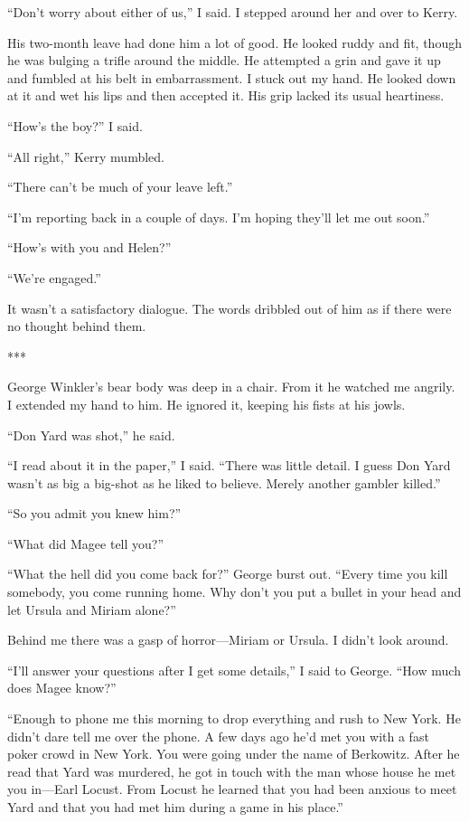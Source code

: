 {“Don’t worry about either of us,” I said. I stepped around her and over to Kerry.

His two-month leave had done him a lot of good. He looked ruddy and fit, though he was bulging a trifle around the middle. He attempted a grin and gave it up and fumbled at his belt in embarrassment. I stuck out my hand. He looked down at it and wet his lips and then accepted it. His grip lacked its usual heartiness.

“How’s the boy?” I said.

“All right,” Kerry mumbled.

“There can’t be much of your leave left.”

“I’m reporting back in a couple of days. I’m hoping they’ll let me out soon.”

“How’s with you and Helen?”

“We’re engaged.”

It wasn’t a satisfactory dialogue. The words dribbled out of him as if there were no thought behind them.

***

George Winkler’s bear body was deep in a chair. From it he watched me angrily. I extended my hand to him. He ignored it, keeping his fists at his jowls.

“Don Yard was shot,” he said.

“I read about it in the paper,” I said. “There was little detail. I guess Don Yard wasn’t as big a big-shot as he liked to believe. Merely another gambler killed.”

“So you admit you knew him?”

“What did Magee tell you?”

“What the hell did you come back for?” George burst out. “Every time you kill somebody, you come running home. Why don’t you put a bullet in your head and let Ursula and Miriam alone?”

Behind me there was a gasp of horror—Miriam or Ursula. I didn’t look around.

“I’ll answer your questions after I get some details,” I said to George. “How much does Magee know?”

“Enough to phone me this morning to drop everything and rush to New York. He didn’t dare tell me over the phone. A few days ago he’d met you with a fast poker crowd in New York. You were going under the name of Berkowitz. After he read that Yard was murdered, he got in touch with the man whose house he met you in—Earl Locust. From Locust he learned that you had been anxious to meet Yard and that you had met him during a game in his place.”

}
